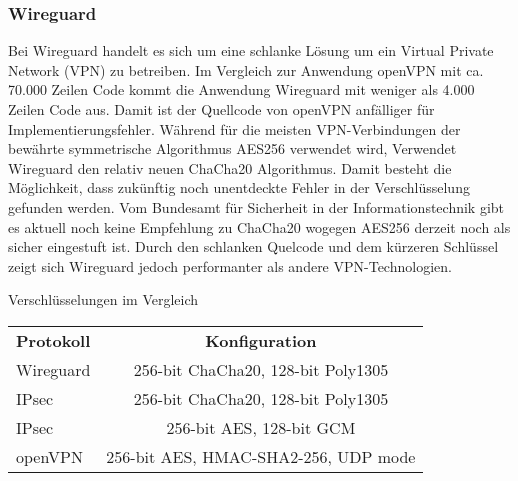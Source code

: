\newpage
\subsubsection{Wireguard}

Bei Wireguard handelt es sich um eine schlanke L\"osung um ein Virtual Private Network (VPN) zu betreiben. Im Vergleich zur Anwendung openVPN mit ca. 70.000 Zeilen Code kommt die Anwendung Wireguard mit weniger als 4.000 Zeilen Code aus. 
Damit ist der Quellcode von openVPN anf\"alliger f\"ur Implementierungsfehler. W\"ahrend f\"ur die meisten VPN-Verbindungen der bew\"ahrte symmetrische Algorithmus AES256 verwendet wird, Verwendet Wireguard den relativ neuen ChaCha20 Algorithmus. Damit besteht die M\"oglichkeit, dass zuk\"unftig noch unentdeckte Fehler in der Verschl\"usselung gefunden werden. Vom Bundesamt f\"ur Sicherheit in der Informationstechnik gibt es aktuell noch keine Empfehlung zu ChaCha20 wogegen AES256 derzeit noch als sicher eingestuft ist.  
Durch den schlanken Quelcode und dem k\"urzeren Schl\"ussel zeigt sich Wireguard jedoch performanter als andere VPN-Technologien.   

\begin{center}
Verschl\"usselungen im Vergleich
\begin{tabular}{lc}\toprule
\textbf{Protokoll}	&\textbf{Konfiguration} \\ 	
Wireguard	& 256-bit ChaCha20, 128-bit Poly1305 \\
IPsec & 256-bit ChaCha20, 128-bit Poly1305 \\
IPsec	& 256-bit AES, 128-bit GCM \\
openVPN	& 256-bit AES, HMAC-SHA2-256, UDP mode \\
\end{tabular}
\end{center}

